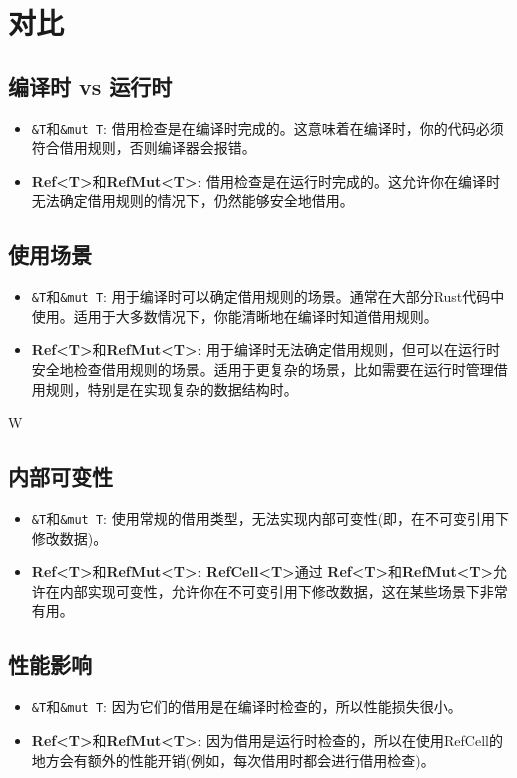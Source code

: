 \documentclass[oneside]{book}
\begin{document}
\section{对比}{
    \subsection{编译时 vs 运行时}{
        \begin{itemize}
            \item \texttt{\&T}和\texttt{\&mut T}: 借用检查是在编译时完成的。这意味着在编译时，你的代码必须符合借用规则，否则编译器会报错。
            \item \textbf{Ref<T>}和\textbf{RefMut<T>}: 借用检查是在运行时完成的。这允许你在编译时无法确定借用规则的情况下，仍然能够安全地借用。
        \end{itemize}
    }

    \subsection{使用场景}{
        \begin{itemize}
            \item \texttt{\&T}和\texttt{\&mut T}: 用于编译时可以确定借用规则的场景。通常在大部分Rust代码中使用。适用于大多数情况下，你能清晰地在编译时知道借用规则。
            \item \textbf{Ref<T>}和\textbf{RefMut<T>}: 用于编译时无法确定借用规则，但可以在运行时安全地检查借用规则的场景。适用于更复杂的场景，比如需要在运行时管理借用规则，特别是在实现复杂的数据结构时。
        \end{itemize}
    }W

    \subsection{内部可变性}{
        \begin{itemize}
            \item \texttt{\&T}和\texttt{\&mut T}: 使用常规的借用类型，无法实现内部可变性(即，在不可变引用下修改数据)。
            \item \textbf{Ref<T>}和\textbf{RefMut<T>}: \textbf{RefCell<T>}通过 \textbf{Ref<T>}和\textbf{RefMut<T>}允许在内部实现可变性，允许你在不可变引用下修改数据，这在某些场景下非常有用。
        \end{itemize}
    }

    \subsection{性能影响}{
        \begin{itemize}
            \item \texttt{\&T}和\texttt{\&mut T}: 因为它们的借用是在编译时检查的，所以性能损失很小。
            \item \textbf{Ref<T>}和\textbf{RefMut<T>}: 因为借用是运行时检查的，所以在使用RefCell的地方会有额外的性能开销(例如，每次借用时都会进行借用检查)。
        \end{itemize}
    }

}
\end{document}
